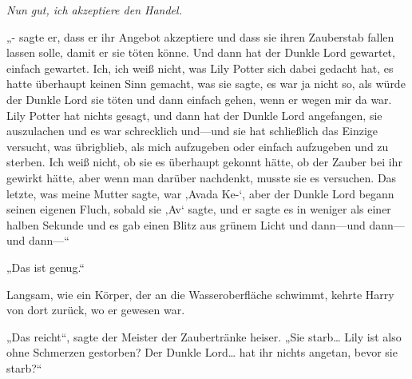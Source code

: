 \emph{Nun gut, ich akzeptiere den Handel.}

„- sagte er, dass er ihr Angebot akzeptiere und dass sie ihren Zauberstab fallen lassen solle, damit er sie töten könne. Und dann hat der Dunkle Lord gewartet, einfach gewartet. Ich, ich weiß nicht, was Lily Potter sich dabei gedacht hat, es hatte überhaupt keinen Sinn gemacht, was sie sagte, es war ja nicht so, als würde der Dunkle Lord sie töten und dann einfach gehen, wenn er wegen mir da war. Lily Potter hat nichts gesagt, und dann hat der Dunkle Lord angefangen, sie auszulachen und es war schrecklich und—und sie hat schließlich das Einzige versucht, was übrigblieb, als mich aufzugeben oder einfach aufzugeben und zu sterben. Ich weiß nicht, ob sie es überhaupt gekonnt hätte, ob der Zauber bei ihr gewirkt hätte, aber wenn man darüber nachdenkt, musste sie es versuchen. Das letzte, was meine Mutter sagte, war ‚Avada Ke-‘, aber der Dunkle Lord begann seinen eigenen Fluch, sobald sie ‚Av‘ sagte, und er sagte es in weniger als einer halben Sekunde und es gab einen Blitz aus grünem Licht und dann—und dann—und dann—“

„Das ist genug.“

Langsam, wie ein Körper, der an die Wasseroberfläche schwimmt, kehrte Harry von dort zurück, wo er gewesen war.

„Das reicht“, sagte der Meister der Zaubertränke heiser. „Sie starb… Lily ist also ohne Schmerzen gestorben? Der Dunkle Lord… hat ihr nichts angetan, bevor sie starb?“

